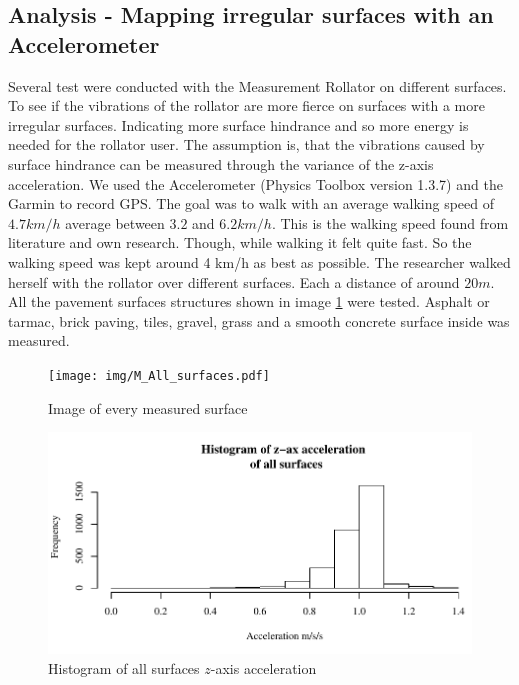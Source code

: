 \subsection{Analysis - Mapping irregular surfaces with an Accelerometer}
Several test were conducted with the Measurement Rollator on different surfaces. To see if the vibrations of the rollator are more fierce on surfaces with a more irregular surfaces. Indicating more surface hindrance and so more energy is needed for the rollator user. The assumption is, that the vibrations caused by surface hindrance can be measured through the variance of the z-axis acceleration. We used the Accelerometer (Physics Toolbox version 1.3.7) and the Garmin to record GPS. The goal was to walk with an average walking speed of $4.7 km/h$ average between $3.2$ and $6.2 km/h$. This is the walking speed found from literature and own research. Though, while walking it felt quite fast. So the walking speed was kept around 4 km/h as best as possible. The researcher walked herself with the rollator over different surfaces. Each a distance of around $20m$. All the pavement surfaces structures shown in image \ref{surfaceimg} were tested. Asphalt or tarmac, brick paving, tiles, gravel, grass and a smooth concrete surface inside was measured. 

\begin{figure}[p]
\texttt{[image: img/M\_All\_surfaces.pdf]}
\centering
\caption{Image of every measured surface \label{surfaceimg}}
\end{figure}

\begin{figure}[p]
\includegraphics[width=\textwidth]{img/M_Histogram_all_surf.pdf}
\centering
\caption{Histogram of all surfaces $z$-axis acceleration \label{hist}}
\end{figure}

